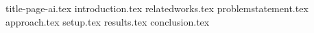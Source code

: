 \documentclass[a4paper,12pt]{report}
\begin{document}
{title-page-ai.tex}
\tableofcontents
\linenumbers
{introduction.tex}
{relatedworks.tex}
{problemstatement.tex}
{approach.tex}
{setup.tex}
{results.tex}
{conclusion.tex}

\printbibliography
\end{document}
